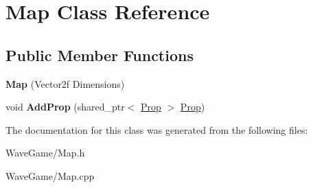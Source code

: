 \hypertarget{class_map}{}\section{Map Class Reference}
\label{class_map}
\subsection*{Public Member Functions}
\begin{DoxyCompactItemize}
\item 
\mbox{\label{class_map_aacaf79e1f034d2dfae1af8cfd162a00b}} 
{\bfseries Map} (Vector2f Dimensions)
\item 
\mbox{\label{class_map_afc6fdc8687757b818ba754eab7ddd4cb}} 
void {\bfseries Add\+Prop} (shared\+\_\+ptr$<$ \hyperlink{class_prop}{Prop} $>$ \hyperlink{class_prop}{Prop})
\end{DoxyCompactItemize}


The documentation for this class was generated from the following files\+:\begin{DoxyCompactItemize}
\item 
Wave\+Game/Map.\+h\item 
Wave\+Game/Map.\+cpp\end{DoxyCompactItemize}
